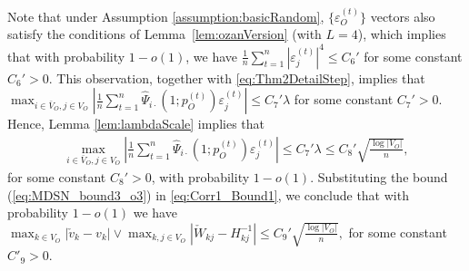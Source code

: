 \documentclass[opre,nonblindrev]{informs3} %
\begin{document}
\begin{APPENDIX}{}
Note that 
under Assumption \ref{assumption:basicRandom}, $\{\varepsilon_O^{(t)}\}$ vectors also satisfy the conditions of Lemma~\ref{lem:ozanVersion} (with $L=4$), 
which implies that with probability $1-o(1)$, we have 
$\frac{1}{n}\sum_{t=1}^n
\left|   
\varepsilon_j^{(t)} \right|^4 \leq C_6'$ for some constant $C_6'>0$.
This observation, together with 
\eqref{eq:Thm2DetailStep}, 
implies that
$\max_{i\in \bar{V}_O, j\in V_O} \left|   \frac{1}{n} \sum_{t=1}^n \hat\Psi_{i\cdot}(1;{p}_O^{(t)} ) \varepsilon_j^{(t)}\right| \leq C_7' \lambda$ for some constant $C_7' > 0$.  
Hence, Lemma \ref{lem:lambdaScale}
implies that
\begin{equation} \label{eq:MDSN_bound3_o3}
\begin{aligned}
\max_{i\in \bar{V}_O, j\in V_O} \left|   \frac{1}{n} \sum_{t=1}^n \hat\Psi_{i\cdot}(1;{p}_O^{(t)} ) \varepsilon_j^{(t)}\right|
\leq C_7' \lambda \leq C_8' \sqrt{\frac{\log |V_O|}{n}},
\end{aligned}
\end{equation}
for some constant $C_8' > 0$, with probability $1-o(1)$.
Substituting the bound (\ref{eq:MDSN_bound3_o3}) in \eqref{eq:Corr1_Bound1}, we conclude that with probability $1-o(1)$ we have
$\max_{k\in V_O} |\check v_k - v_k | \vee\max_{k,j\in V_O} | \check W_{kj} - H^{-1}_{kj} |  \leq C_9' \sqrt{\frac{\log |V_O|}{n}},$ for some constant $C'_9 > 0$.


\end{APPENDIX}
\end{document}
